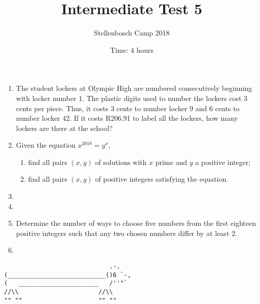 \documentclass{article}
\title{Intermediate Test 5}
\author{Stellenbosch Camp 2018}
\date{Time: $4$ hours}
\begin{document}
 \maketitle

\begin{enumerate}[1.]

\item %
The student lockers at Olympic High are numbered consecutively beginning with locker number 1. The plastic digits used to number the lockers cost $3$ cents per piece. Thus, it costs $3$ cents to number locker $9$ and $6$ cents to number locker $42$. If it costs R206.91 to label all the lockers, how many lockers are there at the school?


\vspace{6pt}
\item %
Given the equation $x^{2018} = y^x$,
\begin{enumerate}
  \item find all pairs $(x,y)$ of solutions with $x$ prime and $y$ a positive integer;
  \item find all pairs $(x,y)$ of positive integers satisfying the equation.
\end{enumerate}


\vspace{6pt}
\item %


\vspace{6pt}
\item %


\vspace{6pt}
\item %
Determine the number of ways to choose five numbers from the first eighteen positive integers such that any two chosen numbers differ by at least $2$.


\vspace{6pt}
\item %


\end{enumerate}


\vfill
\centering
\begin{BVerbatim}
                             .-.
(___________________________()6 `-,
(   ______________________   /''"`
//\\                      //\\
"" ""                     "" ""
\end{BVerbatim}
\end{document}
